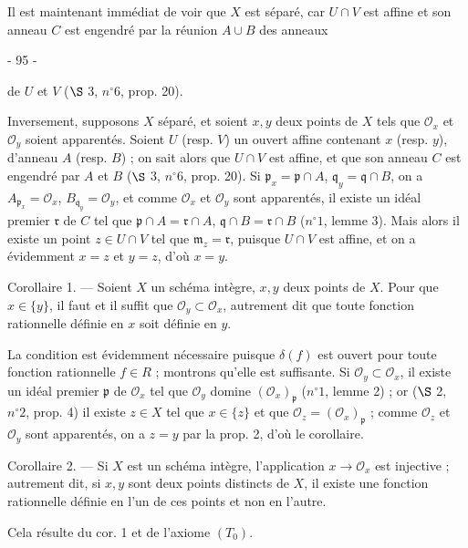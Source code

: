 Il est maintenant immédiat de voir que $X$ est séparé, car $U \cap V$ est affine et son anneau $C$ est engendré par la réunion $A \cup B$ des anneaux

\newpage


- 95 -

de $U$ et $V$ ($\S$ 3, $n^{\circ}6$, prop. 20).

Inversement, supposons $X$ séparé, et soient $x, y$ deux points de $X$ tels que $\mathcal{O}_x$ et $\mathcal{O}_y$ soient apparentés. Soient $U$ (resp. $V$) un ouvert affine contenant $x$ (resp. $y$), d'anneau $A$ (resp. $B$) ; on sait alors que $U \cap V$ est affine, et que son anneau $C$ est engendré par $A$ et $B$ ($\S$ 3, $n^{\circ}6$, prop. 20). Si $\mathfrak{p}_x = \mathfrak{p} \cap A$, $\mathfrak{q}_y = \mathfrak{q} \cap B$, on a $A_{\mathfrak{p}_x} = \mathcal{O}_x$, $B_{\mathfrak{q}_y} = \mathcal{O}_y$, et comme $\mathcal{O}_x$ et $\mathcal{O}_y$ sont apparentés, il existe un idéal premier $\mathfrak{r}$ de $C$ tel que $\mathfrak{p} \cap A = \mathfrak{r} \cap A$, $\mathfrak{q} \cap B = \mathfrak{r} \cap B$ ($n^{\circ}1$, lemme 3). Mais alors il existe un point $z \in U \cap V$ tel que $\mathfrak{m}_z = \mathfrak{r}$, puisque $U \cap V$ est affine, et on a évidemment $x=z$ et $y=z$, d'où $x=y$.

Corollaire 1. — Soient $X$ un schéma intègre, $x, y$ deux points de $X$. Pour que $x \in \{y\}$, il faut et il suffit que $\mathcal{O}_y \subset \mathcal{O}_x$, autrement dit que toute fonction rationnelle définie en $x$ soit définie en $y$.

La condition est évidemment nécessaire puisque $\delta(f)$ est ouvert pour toute fonction rationnelle $f \in R$ ; montrons qu'elle est suffisante. Si $\mathcal{O}_y \subset \mathcal{O}_x$, il existe un idéal premier $\mathfrak{p}$ de $\mathcal{O}_x$ tel que $\mathcal{O}_y$ domine $(\mathcal{O}_x)_{\mathfrak{p}}$ ($n^{\circ}1$, lemme 2) ; or ($\S$ 2, $n^{\circ}2$, prop. 4) il existe $z \in X$ tel que $x \in \{z\}$ et que $\mathcal{O}_z = (\mathcal{O}_x)_{\mathfrak{p}}$ ; comme $\mathcal{O}_z$ et $\mathcal{O}_y$ sont apparentés, on a $z=y$ par la prop. 2, d'où le corollaire.

Corollaire 2. — Si $X$ est un schéma intègre, l'application $x \to \mathcal{O}_x$ est injective ; autrement dit, si $x, y$ sont deux points distincts de $X$, il existe une fonction rationnelle définie en l'un de ces points et non en l'autre.

Cela résulte du cor. 1 et de l'axiome $(T_0)$.

